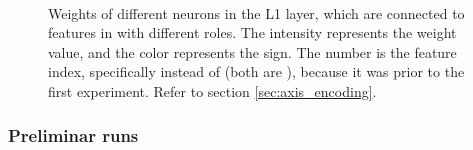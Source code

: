 \begin{figure}[H]
\qquad
{}
\qquad
{} \\

\caption{Weights of different neurons in the L1 layer, which are connected to features in  with different roles. The intensity represents the weight value, and the color represents the sign. The number is the feature index, specifically  instead of  (both are ), because it was prior to the first experiment. Refer to section \ref{sec:axis_encoding}.}
\end{figure}


\subsubsection{Preliminar runs}


